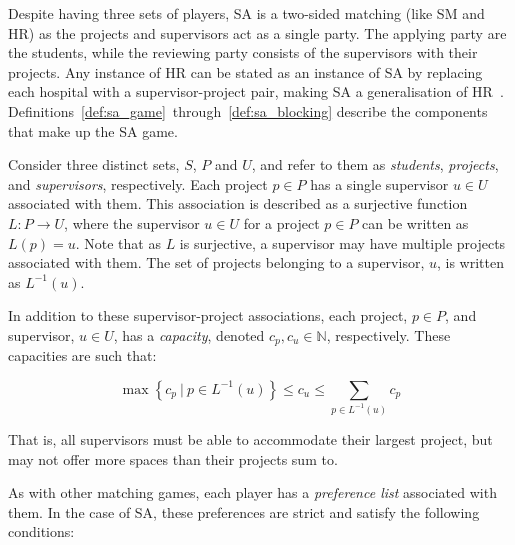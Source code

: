 Despite having three sets of players, SA is a two-sided matching (like SM and
HR) as the projects and supervisors act as a single party. The applying party
are the students, while the reviewing party consists of the supervisors with
their projects. Any instance of HR can be stated as an instance of SA by
replacing each hospital with a supervisor-project pair, making SA a
generalisation of HR~\cite{Abraham2003}.
Definitions~\ref{def:sa_game}~through~\ref{def:sa_blocking} describe the
components that make up the SA game.

\begin{definition}\label{def:sa_game}
    Consider three distinct sets, \(S\), \(P\) and \(U\), and refer to them as
    \emph{students}, \emph{projects}, and \emph{supervisors}, respectively. Each
    project \(p \in P\) has a single supervisor \(u \in U\) associated with
    them. This association is described as a surjective function \(L: P \to U\),
    where the supervisor \(u \in U\) for a project \(p \in P\) can be written as
    \(L(p) = u\). Note that as \(L\) is surjective, a supervisor may have
    multiple projects associated with them. The set of projects belonging to a
    supervisor, \(u\), is written as \(L^{-1}(u)\).

    In addition to these supervisor-project associations, each project, \(p \in
    P\), and supervisor, \(u \in U\), has a \emph{capacity}, denoted \(c_p, c_u
    \in \mathbb N\), respectively. These capacities are such that:

    \begin{equation}
        \max \left\{c_p \ | \ p \in L^{-1}(u)\right\}
        \le c_u
        \le \sum_{p \in L^{-1}(u)} c_p
    \end{equation}

    That is, all supervisors must be able to accommodate their largest project,
    but may not offer more spaces than their projects sum to.

    As with other matching games, each player has a \emph{preference list}
    associated with them. In the case of SA, these preferences are strict and
    satisfy the following conditions:


\end{definition}
